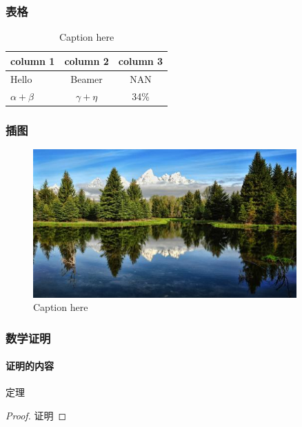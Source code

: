 \documentclass{beamer}
\begin{document}
	\begin{frame}[c] 	
		\frametitle{表格}
		\begin{table}[tb]
			\centering
			\caption{Caption here\label{tab:tablename}}
			\begin{tabular}{l|cc} \hline
				\textbf{column 1} & \textbf{column 2} & \textbf{column 3} \\ \hline
				Hello & Beamer & NAN \\ \hline
				$\alpha+\beta$ & $\gamma+\eta$ & 34\% \\ \hline
			\end{tabular}
		\end{table}
	\end{frame}

	\begin{frame}[c] 	
		\frametitle{插图}
		\begin{figure}[tb]
			\centering
			\includegraphics[width=0.9\textwidth]{image.jpg}
			\caption{Caption here\label{fig:figure1}}
		\end{figure}
	\end{frame}


	\begin{frame}[c]
		\frametitle{数学证明}
		\framesubtitle{证明的内容}
		\begin{theorem}
			定理	
		\end{theorem}
		\begin{proof}
			证明\qedhere
		\end{proof}
	\end{frame}
\end{document}
